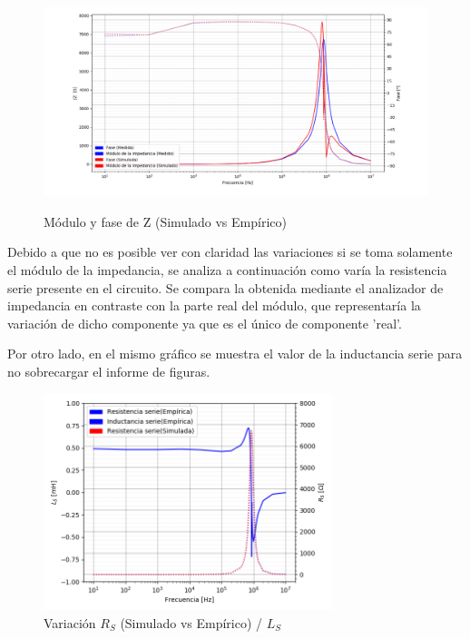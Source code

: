 \begin{figure}[H]
\centering
\includegraphics[width=1\textwidth]{Ejercicio_1(Germo)/Grafico/Inductancia_relacion_entre_Z_y_fases.png}
\label{fig:Inductancia_relacion_entre_Z_y_fases}
\caption{Módulo y fase de Z (Simulado vs Empírico)}
\end{figure}

Debido a que no es posible ver con claridad las variaciones si se toma solamente el módulo de la impedancia, se analiza a continuación como varía la resistencia serie presente en el circuito. Se compara la obtenida mediante el analizador de impedancia en contraste con la parte real del módulo, que representaría la variación de dicho componente ya que es el único de componente 'real'.\par
Por otro lado, en el mismo gráfico se muestra el valor de la inductancia serie para no sobrecargar el informe de figuras.

\begin{figure}[H]
\centering
\includegraphics[width=0.75\textwidth]{Ejercicio_1(Germo)/Grafico/Inductancia_relacion_entre_L_s_y_R_s.png}
\caption{Variación $R_S$ (Simulado vs Empírico) / $L_S$ }
\label{fig:Inductancia_relacion_entre_L_s_y_R_s}
\end{figure}

